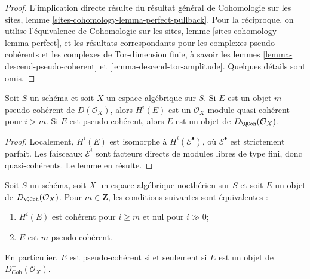 \begin{proof}
L'implication directe r\'esulte du r\'esultat g\'en\'eral de Cohomologie sur les
sites, lemme \ref{sites-cohomology-lemma-perfect-pullback}.
Pour la r\'eciproque, on utilise l'\'equivalence de Cohomologie sur les sites,
lemme \ref{sites-cohomology-lemma-perfect}, et les r\'esultats correspondants
pour les complexes pseudo-coh\'erents et les complexes de Tor-dimension finie,
\`a savoir les lemmes \ref{lemma-descend-pseudo-coherent} et
\ref{lemma-descend-tor-amplitude}. Quelques d\'etails sont omis.
\end{proof}

\begin{lemma}
\label{lemma-pseudo-coherent}
Soit $S$ un sch\'ema et soit $X$ un espace alg\'ebrique sur $S$.
Si $E$ est un objet $m$-pseudo-coh\'erent de $D(\mathcal{O}_X)$, alors
$H^i(E)$ est un $\mathcal{O}_X$-module quasi-coh\'erent pour $i>m$.
Si $E$ est pseudo-coh\'erent, alors $E$ est un objet de
$D_\QCoh(\mathcal{O}_X)$.
\end{lemma}

\begin{proof}
Localement, $H^i(E)$ est isomorphe \`a $H^i(\mathcal{E}^\bullet)$, o\`u
$\mathcal{E}^\bullet$ est strictement parfait. Les faisceaux
$\mathcal{E}^i$ sont facteurs directs de modules libres de type fini, donc
quasi-coh\'erents. Le lemme en r\'esulte.
\end{proof}

\begin{lemma}
\label{lemma-identify-pseudo-coherent-noetherian}
Soit $S$ un sch\'ema, soit $X$ un espace alg\'ebrique noeth\'erien sur $S$ et
soit $E$ un objet de $D_\QCoh(\mathcal{O}_X)$. Pour
$m \in \mathbf{Z}$, les conditions suivantes sont \'equivalentes :
\begin{enumerate}
\item $H^i(E)$ est coh\'erent pour $i \geq m$ et nul pour $i \gg 0$;
\item $E$ est $m$-pseudo-coh\'erent.
\end{enumerate}
En particulier, $E$ est pseudo-coh\'erent si et seulement si $E$ est un objet
de $D^-_{\textit{Coh}}(\mathcal{O}_X)$.
\end{lemma}

